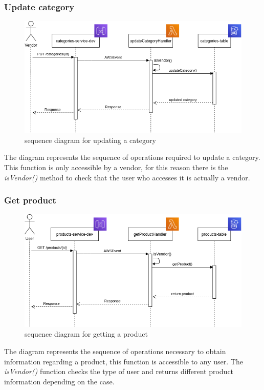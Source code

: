 \subsubsection{Update category}
\begin{figure}[!h]
    \vspace{5px}
    \includegraphics[scale=0.5]{../../../../Images/Diagrammi/maintainerManual/updateCategorySequence.png}
    \centering
    \caption{sequence diagram for updating a category} 
\end{figure}
The diagram represents the sequence of operations required to update a category. This function is only accessible by a vendor, for this reason there is the \textit{isVendor()} method to check that the user who accesses it is actually a vendor.
\pagebreak
\subsubsection{Get product}
\begin{figure}[!h]
    \vspace{5px}
    \includegraphics[scale=0.5]{../../../../Images/Diagrammi/maintainerManual/getProductSequence.png}
    \centering
    \caption{sequence diagram for getting a product} 
\end{figure}
The diagram represents the sequence of operations necessary to obtain information regarding a product, this function is accessible to any user. The \textit{isVendor()} function checks the type of user and returns different product information depending on the case.
